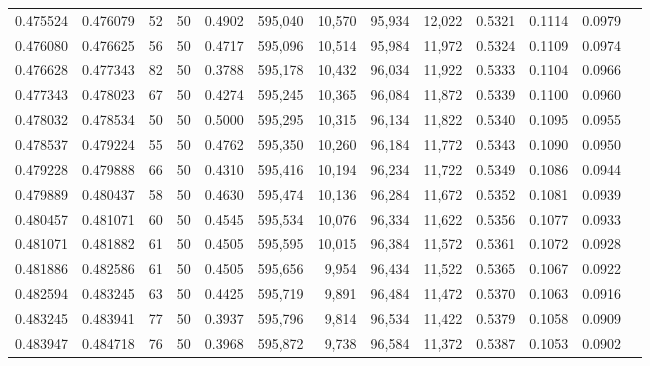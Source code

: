 \begin{tabular}{rrrrrrrrrrrrr}
0.475524 & 0.476079 &    52 &  50 &                                     0.4902 & 595,040 &  10,570 &  95,934 &  12,022 & 0.5321 & 0.1114 & 0.0979 \\
0.476080 & 0.476625 &    56 &  50 &                                     0.4717 & 595,096 &  10,514 &  95,984 &  11,972 & 0.5324 & 0.1109 & 0.0974 \\
0.476628 & 0.477343 &    82 &  50 &                                     0.3788 & 595,178 &  10,432 &  96,034 &  11,922 & 0.5333 & 0.1104 & 0.0966 \\
0.477343 & 0.478023 &    67 &  50 &                                     0.4274 & 595,245 &  10,365 &  96,084 &  11,872 & 0.5339 & 0.1100 & 0.0960 \\
0.478032 & 0.478534 &    50 &  50 &                                     0.5000 & 595,295 &  10,315 &  96,134 &  11,822 & 0.5340 & 0.1095 & 0.0955 \\
0.478537 & 0.479224 &    55 &  50 &                                     0.4762 & 595,350 &  10,260 &  96,184 &  11,772 & 0.5343 & 0.1090 & 0.0950 \\
0.479228 & 0.479888 &    66 &  50 &                                     0.4310 & 595,416 &  10,194 &  96,234 &  11,722 & 0.5349 & 0.1086 & 0.0944 \\
0.479889 & 0.480437 &    58 &  50 &                                     0.4630 & 595,474 &  10,136 &  96,284 &  11,672 & 0.5352 & 0.1081 & 0.0939 \\
0.480457 & 0.481071 &    60 &  50 &                                     0.4545 & 595,534 &  10,076 &  96,334 &  11,622 & 0.5356 & 0.1077 & 0.0933 \\
0.481071 & 0.481882 &    61 &  50 &                                     0.4505 & 595,595 &  10,015 &  96,384 &  11,572 & 0.5361 & 0.1072 & 0.0928 \\
0.481886 & 0.482586 &    61 &  50 &                                     0.4505 & 595,656 &   9,954 &  96,434 &  11,522 & 0.5365 & 0.1067 & 0.0922 \\
0.482594 & 0.483245 &    63 &  50 &                                     0.4425 & 595,719 &   9,891 &  96,484 &  11,472 & 0.5370 & 0.1063 & 0.0916 \\
0.483245 & 0.483941 &    77 &  50 &                                     0.3937 & 595,796 &   9,814 &  96,534 &  11,422 & 0.5379 & 0.1058 & 0.0909 \\
0.483947 & 0.484718 &    76 &  50 &                                     0.3968 & 595,872 &   9,738 &  96,584 &  11,372 & 0.5387 & 0.1053 & 0.0902 \\

\end{tabular}
